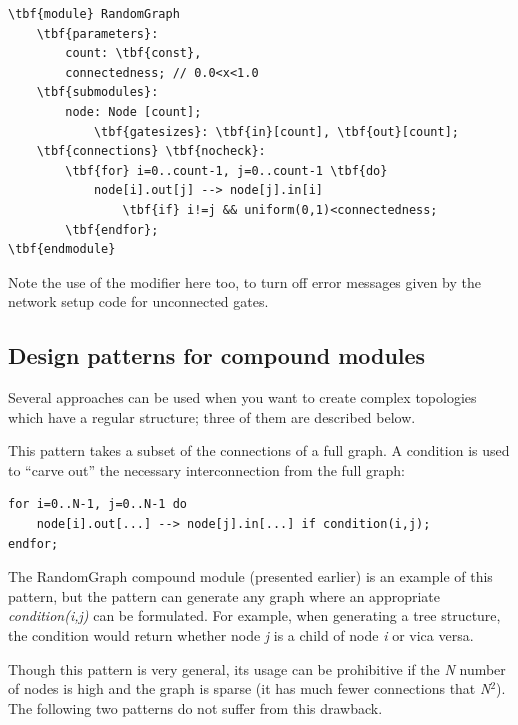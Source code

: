 \begin{Verbatim}[commandchars=\\\{\}]
\tbf{module} RandomGraph
    \tbf{parameters}:
        count: \tbf{const},
        connectedness; // 0.0<x<1.0
    \tbf{submodules}:
        node: Node [count];
            \tbf{gatesizes}: \tbf{in}[count], \tbf{out}[count];
    \tbf{connections} \tbf{nocheck}:
        \tbf{for} i=0..count-1, j=0..count-1 \tbf{do}
            node[i].out[j] --> node[j].in[i]
                \tbf{if} i!=j && uniform(0,1)<connectedness;
        \tbf{endfor};
\tbf{endmodule}
\end{Verbatim}

Note the use of the  modifier
here too, to turn off error messages given by the network setup code
for unconnected gates.


\subsection{Design patterns for compound modules}


Several approaches can be used when you want to create complex
topologies which have a regular structure; three of them are
described below.




This pattern takes a subset of the connections of a full graph.  A
condition is used to ``carve out'' the necessary interconnection from
the full graph:


\begin{Verbatim}[commandchars=\\\{\}]
for i=0..N-1, j=0..N-1 do
    node[i].out[...] --> node[j].in[...] if condition(i,j);
endfor;
\end{Verbatim}




The RandomGraph compound module (presented earlier) is an example of
this pattern, but the pattern can generate any graph where an
appropriate \textit{condition(i,j)} can be formulated. For example,
when generating a tree structure, the condition
would return whether node \textit{j} is a child of node \textit{i} or
vica versa.

Though this pattern is very general, its usage can be prohibitive if
the \textit{N} number of nodes is high and the graph is sparse (it has
much fewer connections that \textit{N}$^{\mathit{2}}$). The following
two patterns do not suffer from this drawback.


